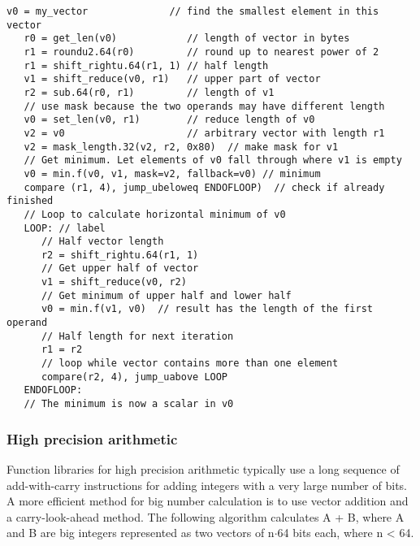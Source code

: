 \documentclass[forwardcom.tex]{subfiles}
\begin{document}
\begin{lstlisting}[frame=none]
   v0 = my_vector              // find the smallest element in this vector
   r0 = get_len(v0)            // length of vector in bytes
   r1 = roundu2.64(r0)         // round up to nearest power of 2
   r1 = shift_rightu.64(r1, 1) // half length
   v1 = shift_reduce(v0, r1)   // upper part of vector
   r2 = sub.64(r0, r1)         // length of v1
   // use mask because the two operands may have different length
   v0 = set_len(v0, r1)        // reduce length of v0
   v2 = v0                     // arbitrary vector with length r1
   v2 = mask_length.32(v2, r2, 0x80)  // make mask for v1
   // Get minimum. Let elements of v0 fall through where v1 is empty
   v0 = min.f(v0, v1, mask=v2, fallback=v0) // minimum
   compare (r1, 4), jump_ubeloweq ENDOFLOOP)  // check if already finished
   // Loop to calculate horizontal minimum of v0
   LOOP: // label
      // Half vector length
      r2 = shift_rightu.64(r1, 1)
      // Get upper half of vector
      v1 = shift_reduce(v0, r2)
      // Get minimum of upper half and lower half
      v0 = min.f(v1, v0)  // result has the length of the first operand
      // Half length for next iteration
      r1 = r2
      // loop while vector contains more than one element
      compare(r2, 4), jump_uabove LOOP      
   ENDOFLOOP:      
   // The minimum is now a scalar in v0
\end{lstlisting}


\subsubsection{High precision arithmetic} \label{highPrecisionArithmetic}
Function libraries for high precision arithmetic typically use a long sequence of add-with-carry instructions for adding integers with a very large number of bits. A more efficient method for big number calculation is to use vector addition and a carry-look-ahead method. The following algorithm calculates A + B, where A and B are big integers represented as two vectors of n$\cdot$64 bits each, where n \textless{} 64.
\vspace{2mm}
\end{document}
